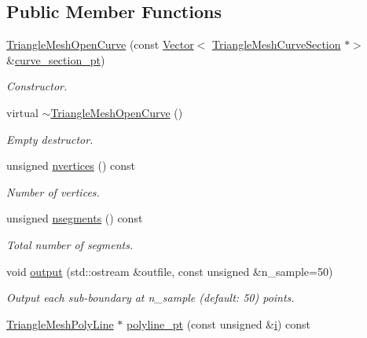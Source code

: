 \subsection*{Public Member Functions}
\begin{DoxyCompactItemize}
\item 
\hyperlink{classoomph_1_1TriangleMeshOpenCurve_ae3e5fc58a6e6a07aea42909386340b06}{Triangle\+Mesh\+Open\+Curve} (const \hyperlink{classoomph_1_1Vector}{Vector}$<$ \hyperlink{classoomph_1_1TriangleMeshCurveSection}{Triangle\+Mesh\+Curve\+Section} $\ast$$>$ \&\hyperlink{classoomph_1_1TriangleMeshCurve_a8a8d36c6b35f1bffd760877da4f3d52f}{curve\+\_\+section\+\_\+pt})
\begin{DoxyCompactList}\small\item\em Constructor. \end{DoxyCompactList}\item 
virtual \hyperlink{classoomph_1_1TriangleMeshOpenCurve_a70a3975f694fcf8bc7c2187ee40da177}{$\sim$\+Triangle\+Mesh\+Open\+Curve} ()
\begin{DoxyCompactList}\small\item\em Empty destructor. \end{DoxyCompactList}\item 
unsigned \hyperlink{classoomph_1_1TriangleMeshOpenCurve_ac9671f91a0433ec5cab5a3b7dac45261}{nvertices} () const
\begin{DoxyCompactList}\small\item\em Number of vertices. \end{DoxyCompactList}\item 
unsigned \hyperlink{classoomph_1_1TriangleMeshOpenCurve_a639fc3a8b9860c98abc7c2d09f6917d8}{nsegments} () const
\begin{DoxyCompactList}\small\item\em Total number of segments. \end{DoxyCompactList}\item 
void \hyperlink{classoomph_1_1TriangleMeshOpenCurve_adfffbe10445328b0b021b82443ff8458}{output} (std\+::ostream \&outfile, const unsigned \&n\+\_\+sample=50)
\begin{DoxyCompactList}\small\item\em Output each sub-\/boundary at n\+\_\+sample (default\+: 50) points. \end{DoxyCompactList}\item 
\hyperlink{classoomph_1_1TriangleMeshPolyLine}{Triangle\+Mesh\+Poly\+Line} $\ast$ \hyperlink{classoomph_1_1TriangleMeshOpenCurve_ac9fa3405aa0b7d2aef03a12b7b1f3b40}{polyline\+\_\+pt} (const unsigned \&\hyperlink{cfortran_8h_adb50e893b86b3e55e751a42eab3cba82}{i}) const
$$
\end{DoxyCompactItemize}
